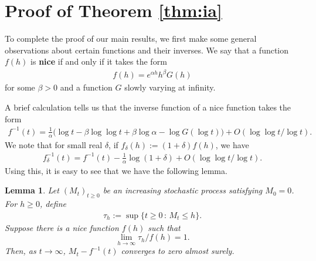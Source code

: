 \documentclass[a4,12pt]{amsart}
\numberwithin{equation}{section}
\newtheorem{lemma}[thm]{Lemma}
\begin{document}
\color{black}
\section{Proof of Theorem \ref{thm:ia}} \label{sec:proof}

	To complete the proof of our main results, we first make some general 
	observations about certain functions and their inverses. 
	We say that a function $f(h)$ is \textbf{nice} if and only if it takes the form
	\begin{align*}
		f(h) = e^{\alpha h} h^\beta G(h)
	\end{align*}
	for some $\beta > 0$ and a function $G$ slowly varying at infinity.

	A brief calculation tells us that the inverse function of a nice function takes the form
	\begin{align} \label{eq:ad}
		f^{-1}(t) = \frac{1}{\alpha} 
		\big( \log t - \beta \log \log t + \beta \log \alpha - \log G( \log t ) \big) 
		+ O(\log \log t / \log t).
	\end{align}
	We note that for small real $\delta$, if $f_\delta(h) := (1+\delta)f(h)$,
	we have
	\begin{align} \label{eq:ad2}
		f^{-1}_\delta(t) = f^{-1}(t) - \frac{1}{\alpha} \log(1+\delta) + O(\log \log t/\log t). 
	\end{align}
	Using this, it is easy to see that we have the following lemma.

	\begin{lemma} \label{lem:bothways}
		Let $(M_t)_{t \geq 0}$ be an increasing stochastic 
		process satisfying $M_0 = 0$. For $h \geq 0$, define
		\begin{align*}
			\tau_h := \sup \{ t \geq 0 \,:\, M_t \leq h \}.
		\end{align*}
		Suppose there is a nice function $f(h)$ such that 
		\begin{equation*}
			\lim_{h \to \infty}\tau_h/f(h) =1.
		\end{equation*}
		Then, as $t\to\infty$, $M_t - f^{-1}(t)$ converges to zero almost surely.
	\end{lemma}
\end{document}
